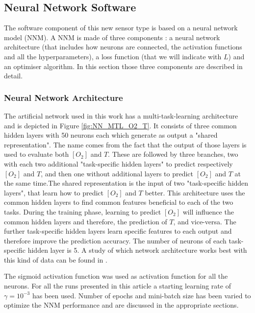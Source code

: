 \documentclass[9pt,twocolumn,twoside,pdftex]{optica}
\begin{document}

\subsection{Neural Network Software}
\label{NN}



The software component of this new sensor type is based on a neural network model (NNM). A NNM is made of three components \cite{Michelucci2017}: a neural network architecture (that includes how neurons are connected, the activation functions and all the hyperparameters), a loss function (that we will indicate with $L$) and an optimiser algorithm. In this section those three components are described in detail.

\subsubsection{Neural Network Architecture}

The artificial network used in this work has a multi-task-learning architecture and is depicted in Figure \ref{fig:NN_MTL_O2_T}. It consists of three common hidden layers with 50 neurons each which generate as output a "shared representation". The name comes from the fact that the output of those layers is used to evaluate both $[O_2]$ and $T$. These are followed by three branches, two with each two additional "task-specific hidden layers" to predict respectively $[O_2]$ and $T$, and then one without additional layers to predict $[O_2]$ and $T$ at the same time.The shared representation is the input of two "task-specific hidden layers", that learn how to predict $[O_2]$ and $T$ better. This architecture uses the common hidden layers to find common features beneficial to each of the two tasks. During the training phase, learning to predict $[O_2]$ will influence the common hidden layers and therefore, the prediction of $T$, and vice-versa. The further task-specific hidden layers learn specific features to each output and therefore improve the prediction accuracy. The number of neurons of each task-specific hidden layer is 5. A study of which network architecture works best with this kind of data can be found in \cite{Michelucci2019}.

The sigmoid activation function was used as activation function for all the neurons. For all the runs presented in this article a starting learning rate of $\gamma = 10^{-3}$ has been used. Number of epochs and mini-batch size has been varied to optimize the NNM performance and are discussed in the appropriate sections. 
\end{document}
